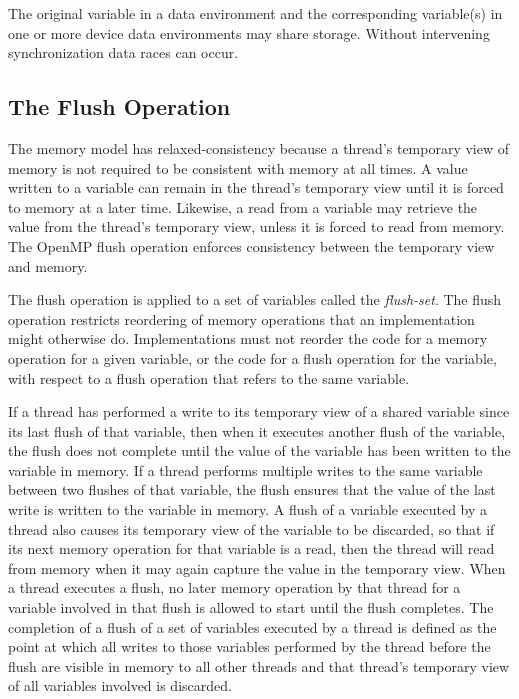 The original variable in a data environment and the corresponding variable(s) in one or
more device data environments may share storage. Without intervening synchronization  
data races can occur.




\subsection{The Flush Operation}
\label{subsec:The Flush Operation}
The memory model has relaxed-consistency because a thread’s temporary view of
memory is not required to be consistent with memory at all times. A value written to a
variable can remain in the thread’s temporary view until it is forced to memory at a later
time. Likewise, a read from a variable may retrieve the value from the thread’s
temporary view, unless it is forced to read from memory. The OpenMP flush operation
enforces consistency between the temporary view and memory.

The flush operation is applied to a set of variables called the \emph{flush-set}. The flush
operation restricts reordering of memory operations that an implementation might
otherwise do. Implementations must not reorder the code for a memory operation for a
given variable, or the code for a flush operation for the variable, with respect to a flush
operation that refers to the same variable. 

If a thread has performed a write to its temporary view of a shared variable since its last
flush of that variable, then when it executes another flush of the variable, the flush does
not complete until the value of the variable has been written to the variable in memory.
If a thread performs multiple writes to the same variable between two flushes of that
variable, the flush ensures that the value of the last write is written to the variable in
memory. A flush of a variable executed by a thread also causes its temporary view of the
variable to be discarded, so that if its next memory operation for that variable is a read,
then the thread will read from memory when it may again capture the value in the 
temporary view. When a thread executes a flush, no later memory operation by that
thread for a variable involved in that flush is allowed to start until the flush completes.
The completion of a flush of a set of variables executed by a thread is defined as the
point at which all writes to those variables performed by the thread before the flush are 
visible in memory to all other threads and that thread’s temporary view of all variables
involved is discarded.


